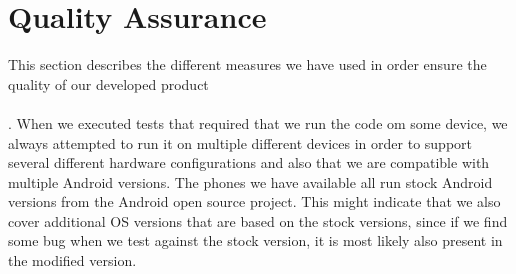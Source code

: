 
\chapter{Quality Assurance}
\label{cha:quality_assurance}

This section describes the different measures we have used in order ensure the quality of our developed product 
\\\\
. 
When we executed tests that required that we run the code om some device, we always attempted to run it on multiple different devices in order to support several different hardware configurations and also that we are compatible with multiple Android versions. The phones we have available all run stock Android versions from the Android open source project. This might indicate that we also cover additional OS versions that are based on the stock versions, since if we find some bug when we test against the stock version, it is most likely also present in the modified version. 












